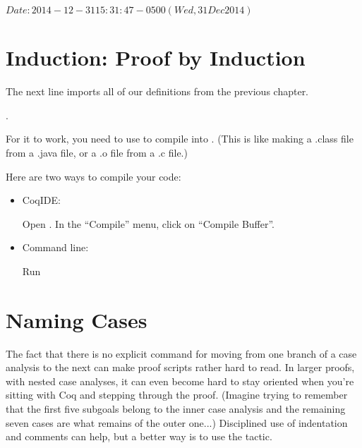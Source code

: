\documentclass[12pt]{report}
\begin{document}
 $Date: 2014-12-31 15:31:47 -0500 (Wed, 31 Dec 2014) $ \begin{coqdoccode}
\coqdocemptyline
\end{coqdoccode}

\begin{coqdoccode}
\end{coqdoccode}
\section{Induction: Proof by Induction}



 The next line imports all of our definitions from the
    previous chapter. \begin{coqdoccode}
\coqdocemptyline
\coqdocnoindent
{}  .\coqdoceol
\coqdocemptyline
\end{coqdoccode}
For it to work, you need to use  to compile 
    into .  (This is like making a .class file from a .java
    file, or a .o file from a .c file.)


    Here are two ways to compile your code:



\begin{itemize}
\item  CoqIDE:


         Open .
         In the ``Compile'' menu, click on ``Compile Buffer''.



\item  Command line:


         Run  

\end{itemize}


    \begin{coqdoccode}
\coqdocemptyline
\end{coqdoccode}
\section{Naming Cases}



 The fact that there is no explicit command for moving from
    one branch of a case analysis to the next can make proof scripts
    rather hard to read.  In larger proofs, with nested case analyses,
    it can even become hard to stay oriented when you're sitting with
    Coq and stepping through the proof.  (Imagine trying to remember
    that the first five subgoals belong to the inner case analysis and
    the remaining seven cases are what remains of the outer one...)
    Disciplined use of indentation and comments can help, but a better
    way is to use the  tactic. 
\end{document}
